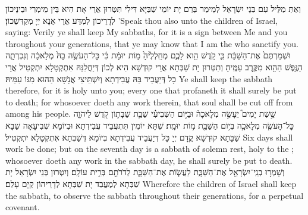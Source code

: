 {וְאַתְּ מַלֵּיל עִם בְּנֵי יִשְׂרָאֵל לְמֵימַר בְּרַם יָת יוֹמֵי שַׁבַּיָּא דִּילִי תִּטְּרוּן אֲרֵי אָת הִיא בֵּין מֵימְרִי וּבֵינֵיכוֹן לְדָרֵיכוֹן לְמִדַּע אֲרֵי אֲנָא יְיָ מְקַדִּשְׁכוֹן׃}
{’Speak thou also unto the children of Israel, saying: Verily ye shall keep My sabbaths, for it is a sign between Me and you throughout your generations, that ye may know that I am the \lord\space who sanctify you.}{}
{וּשְׁמַרְתֶּם֙ אֶת־הַשַּׁבָּ֔ת כִּ֛י קֹ֥דֶשׁ הִ֖וא לָכֶ֑ם מְחַֽלְלֶ֙יהָ֙ מ֣וֹת יוּמָ֔ת כִּ֗י כׇּל־הָעֹשֶׂ֥ה בָהּ֙ מְלָאכָ֔ה וְנִכְרְתָ֛ה הַנֶּ֥פֶשׁ הַהִ֖וא מִקֶּ֥רֶב עַמֶּֽיהָ׃
}
{וְתִטְּרוּן יָת שַׁבְּתָא אֲרֵי קוּדְשָׁא הִיא לְכוֹן דְּיַחֲלִנַּהּ אִתְקְטָלָא יִתְקְטִיל אֲרֵי כָל דְּיַעֲבֵיד בַּהּ עֲבִידְתָא וְיִשְׁתֵּיצֵי אֲנָשָׁא הַהוּא מִגּוֹ עַמֵּיהּ׃}
{Ye shall keep the sabbath therefore, for it is holy unto you; every one that profaneth it shall surely be put to death; for whosoever doeth any work therein, that soul shall be cut off from among his people.}{}
{שֵׁ֣שֶׁת יָמִים֮ יֵעָשֶׂ֣ה מְלָאכָה֒ וּבַיּ֣וֹם הַשְּׁבִיעִ֗י שַׁבַּ֧ת שַׁבָּת֛וֹן קֹ֖דֶשׁ לַיהֹוָ֑ה כׇּל־הָעֹשֶׂ֧ה מְלָאכָ֛ה בְּי֥וֹם הַשַּׁבָּ֖ת מ֥וֹת יוּמָֽת׃
}
{שִׁתָּא יוֹמִין תִּתְעֲבֵיד עֲבִידְתָא וּבְיוֹמָא שְׁבִיעָאָה שַׁבָּא שַׁבָּתָא קוּדְשָׁא קֳדָם יְיָ כָּל דְּיַעֲבֵיד עֲבִידְתָא בְּיוֹמָא דְּשַׁבְּתָא אִתְקְטָלָא יִתְקְטִיל׃}
{Six days shall work be done; but on the seventh day is a sabbath of solemn rest, holy to the \lord; whosoever doeth any work in the sabbath day, he shall surely be put to death.}{}
{וְשָׁמְר֥וּ בְנֵֽי־יִשְׂרָאֵ֖ל אֶת־הַשַּׁבָּ֑ת לַעֲשׂ֧וֹת אֶת־הַשַּׁבָּ֛ת לְדֹרֹתָ֖ם בְּרִ֥ית עוֹלָֽם׃}
{וְיִטְּרוּן בְּנֵי יִשְׂרָאֵל יָת שַׁבְּתָא לְמֶעֱבַד יָת שַׁבְּתָא לְדָרֵיהוֹן קְיָם עָלַם׃}
{Wherefore the children of Israel shall keep the sabbath, to observe the sabbath throughout their generations, for a perpetual covenant.}{}
